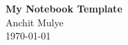 \begin{titlepage}
    \thispagestyle{empty} %
    \centering
    \vspace*{\fill}     %

    \begin{center}
        \vspace*{2cm}   %
        {\Huge \textbf{My Notebook Template}}\\
        \vspace{1cm}
        {\Large Anchit Mulye}\\
        \vspace{0.5cm}
        {\Large \today}
    \end{center}

    \vspace*{\fill}     %
\end{titlepage}